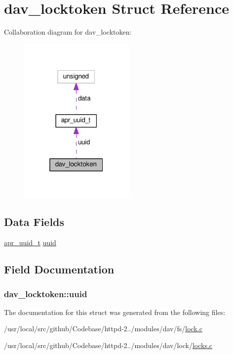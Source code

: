 \hypertarget{structdav__locktoken}{}\section{dav\+\_\+locktoken Struct Reference}
\label{structdav__locktoken}


Collaboration diagram for dav\+\_\+locktoken\+:
\nopagebreak
\begin{figure}[H]
\begin{center}
\leavevmode
\includegraphics[width=160pt]{structdav__locktoken__coll__graph}
\end{center}
\end{figure}
\subsection*{Data Fields}
\begin{DoxyCompactItemize}
\item 
\hyperlink{structapr__uuid__t}{apr\+\_\+uuid\+\_\+t} \hyperlink{structdav__locktoken_a107816d63ee0dc7084d741483cd9b029}{uuid}
\end{DoxyCompactItemize}


\subsection{Field Documentation}
\subsubsection[{\texorpdfstring{uuid}{uuid}}]{ dav\+\_\+locktoken\+::uuid}\hypertarget{structdav__locktoken_a107816d63ee0dc7084d741483cd9b029}{}\label{structdav__locktoken_a107816d63ee0dc7084d741483cd9b029}


The documentation for this struct was generated from the following files\+:\begin{DoxyCompactItemize}
\item 
/usr/local/src/github/\+Codebase/httpd-\/2../modules/dav/fs/\hyperlink{lock_8c}{lock.\+c}\item 
/usr/local/src/github/\+Codebase/httpd-\/2../modules/dav/lock/\hyperlink{locks_8c}{locks.\+c}\end{DoxyCompactItemize}
